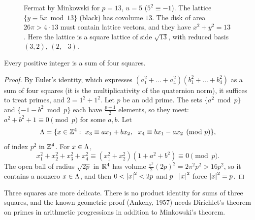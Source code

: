 \begin{figure}[ht]
\centering
{}
\caption{Fermat by Minkowski for $p=13$, $u=5$ ($5^2\equiv-1$). The lattice
$\{y\equiv5x\bmod13\}$ (black) has covolume $13$. The disk of area $26\pi>4\cdot13$ must contain
lattice vectors, and they have $x^2+y^2=13$. Here the lattice is a square lattice of side $\sqrt{13}$,
with reduced basis $(3,2)$, $(2,-3)$.}
\label{NT:fig:fermat}
\end{figure}

\begin{theorem}\label{NT:thm:lagrange4}
Every positive integer is a sum of four squares.
\end{theorem}

\begin{proof}
By Euler's identity, which expresses $(a_1^2+\dots+a_4^2)(b_1^2+\dots+b_4^2)$ as a sum of four squares
(it is the multiplicativity of the quaternion norm), it suffices to treat primes, and $2=1^2+1^2$. Let
$p$ be an odd prime. The sets $\{a^2\bmod p\}$ and $\{-1-b^2\bmod p\}$ each have $\frac{p+1}2$
elements, so they meet: $a^2+b^2+1\equiv0\pmod p$ for some $a,b$. Let
\[
  \Lat=\{x\in\Z^4:\ x_3\equiv ax_1+bx_2,\ \ x_4\equiv bx_1-ax_2\pmod p\},
\]
of index $p^2$ in $\mathbb{Z}^4$. For $x\in\Lambda$,
\[
  x_1^2+x_2^2+x_3^2+x_4^2\equiv(x_1^2+x_2^2)(1+a^2+b^2)\equiv0\pmod p .
\]
The open ball of radius $\sqrt{2p}$ in $\mathbb{R}^4$ has volume $\frac{\pi^2}{2}(2p)^2=2\pi^2p^2>16p^2$, so
it contains a nonzero $x\in\Lambda$, and then $0<\left\lvert x \right\rvert^2<2p$ and $p\mid\left\lvert x \right\rvert^2$ force $\left\lvert x \right\rvert^2=p$.
\end{proof}

Three squares are more delicate. There is no product identity for sums of three squares, and the known
geometric proof (Ankeny, 1957) needs Dirichlet's theorem on primes in arithmetic progressions in
addition to Minkowski's theorem.

